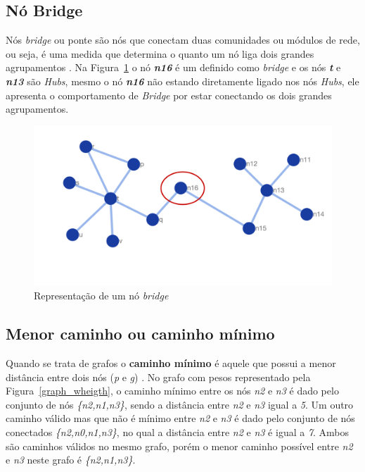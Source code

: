 \subsection{Nó Bridge}
Nós \textsl{bridge} ou ponte são nós que conectam duas comunidades ou módulos de rede, ou seja, é uma medida que determina o quanto um nó liga dois grandes agrupamentos \cite{Hwang2006}.
Na Figura~\ref{graph_bridge} o nó \textbf{\textsl{n16}} é um definido como \textsl{bridge} e os nós \textbf{\textsl{t}} e \textbf{\textsl{n13}} são \textsl{Hubs}, mesmo o nó \textsl{\textbf{n16}} não estando diretamente ligado nos nós \textsl{Hubs}, ele apresenta o comportamento de \textsl{Bridge} por estar conectando os dois grandes agrupamentos.
%
\begin{figure}[ht!]
\centering
\includegraphics[width=\textwidth]{Images/graph_bridge.png}
\caption {Representação de um nó \textsl{bridge}
\label{graph_bridge}}
\end{figure}

\subsection{Menor caminho ou caminho mínimo}
Quando se trata de grafos o \textbf{caminho mínimo} é aquele que possui a menor distância entre dois nós (\textsl{p} e \textsl{g}) \cite{Dijkstra1959}. No grafo com pesos representado pela Figura~\ref{graph_wheigth}, o caminho mínimo entre os nós \textsl{n2} e \textsl{n3} é dado pelo conjunto de nós \textsl{\{n2,n1,n3\}}, sendo a distância entre \textsl{n2} e \textsl{n3} igual a \textsl{5}. Um outro caminho válido mas que não é mínimo entre \textsl{n2} e \textsl{n3} é dado pelo conjunto de nós conectados \textsl{\{n2,n0,n1,n3\}}, no qual a distância entre \textsl{n2} e \textsl{n3} é igual a \textsl{7}. Ambos são caminhos válidos no mesmo grafo, porém o menor caminho possível entre \textsl{n2} e \textsl{n3} neste grafo é \textsl{\{n2,n1,n3\}}.

